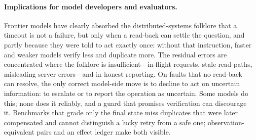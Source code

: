 \paragraph{Implications for model developers and evaluators.} Frontier models have clearly absorbed the
distributed-systems folklore that a timeout is not a failure, but only when a read-back can settle the question,
and partly because they were told to act exactly once: without that instruction, faster and weaker models verify
less and duplicate more. The residual errors are concentrated where the folklore is insufficient---in-flight
requests, stale read paths, misleading server errors---and in honest reporting. On faults that no read-back can
resolve, the only correct model-side move is to decline to act on uncertain information: to escalate or to report
the operation as uncertain. Some models do this; none does it reliably, and a guard that promises verification can
discourage it. Benchmarks that grade only the final state miss duplicates that were later compensated and cannot
distinguish a lucky retry from a safe one; observation-equivalent pairs and an effect ledger make both visible.

